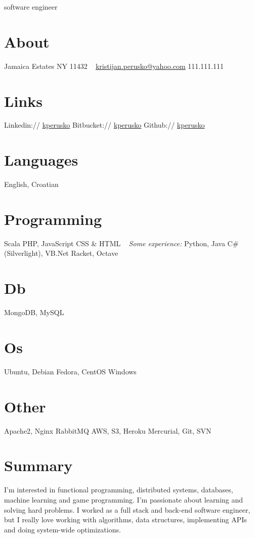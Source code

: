 \documentclass[]{cv}
\begin{document}
       {software engineer}


\begin{aside}
  \section{About}
    Jamaica Estates
    NY 11432
~
    \href{mailto:kristijan.perusko@yahoo.com}{kristijan.perusko@yahoo.com}
    111.111.111
  \section{Links}  
    Linkedin://  \href{https://www.linkedin.com/in/kperusko}{kperusko}
    Bitbucket:// \href{https://bitbucket.org/kperusko}{kperusko}    
    Github:// \href{https://github.com/kperusko}{kperusko}
  \section{Languages}
    English, Croatian
  \section{Programming}
    Scala
    PHP, JavaScript
    CSS \& HTML
~     
    \emph{Some experience:}
    Python, Java
    C\# (Silverlight), VB.Net
    Racket, Octave
  \section{Db}
    MongoDB, MySQL
  \section{Os}
    Ubuntu, Debian 
    Fedora, CentOS
    Windows
  \section{Other}
    Apache2, Nginx
    RabbitMQ
    AWS, S3, Heroku
    Mercurial, Git, SVN
\end{aside}

\section{Summary}

I’m interested in functional programming, distributed systems, databases, machine learning and game programming. I'm passionate about learning and solving hard problems. I worked as a full stack and back-end software engineer, but I really love working with algorithms, data structures, implementing APIs and doing system-wide optimizations.
\end{document}
